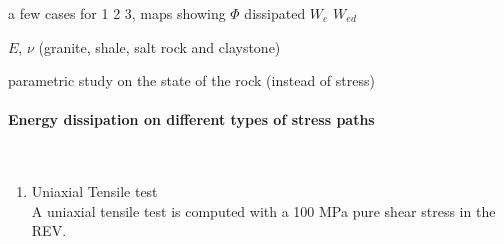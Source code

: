 \documentclass[preprint,review,12pt]{elsarticle}
\begin{document}
a few cases for 1 2 3, maps showing $\Phi$ dissipated $W_e$ $W_{ed}$

$E$, $\nu$ (granite, shale, salt rock and claystone)

parametric study on the state of the rock (instead of stress)

\paragraph{Energy dissipation on different types of stress paths}
\
\\
\begin{enumerate}
\item Uniaxial Tensile test
\
\\
A uniaxial tensile test is computed with a 100 MPa pure shear stress in the REV.
\
\\
\begin{figure}[htbp]
\end{figure}
\end{enumerate}
\end{document}
